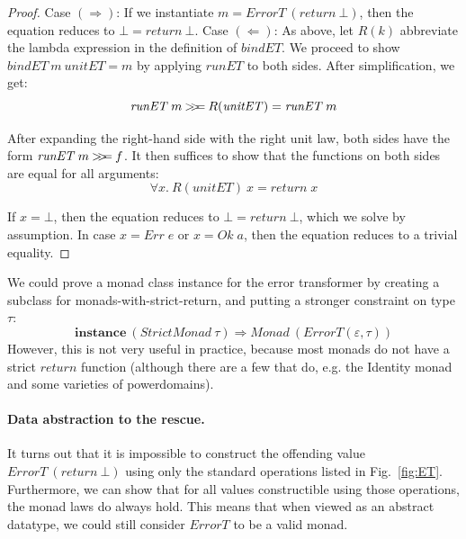 \documentclass{sigplanconf}
\newcommand{\hsbind}{\mathbin{>\mkern-6mu>\mkern-6.5mu=}}
\newcommand{\To}{\mathbin{\Rightarrow}}
\newcommand{\kwd}[1]{\mathbf{#1}}
\newcommand{\hsc}[1]{\ensuremath{\mathit{#1}}}
\newcommand{\tE}{\varepsilon}
\newcommand{\tT}{\tau}
\theoremstyle{definition}
\begin{document}
\begin{proof}
Case $(\Longrightarrow)$: If we instantiate $m = \hsc{ErrorT}\:(\hsc{return}\:\bot)$, then the equation reduces to $\bot = \hsc{return}\:\bot$. Case $(\Longleftarrow)$: As above, let $R(k)$ abbreviate the lambda expression in the definition of \hsc{bindET}. We proceed to show $\hsc{bindET}\:m\:\hsc{unitET} = m$ by applying \hsc{runET} to both sides. After simplification, we get:
\begin{equation*}
\hsc{runET}\:m \hsbind R(\hsc{unitET}) = \hsc{runET}\:m
\end{equation*}

After expanding the right-hand side with the right unit law, both sides have the form $\hsc{runET}\:m \hsbind f$. It then suffices to show that the functions on both sides are equal for all arguments:
%
\begin{equation*}
\forall{x}.\:R(\hsc{unitET})\:x = \hsc{return}\;x
\end{equation*}

If $x = \bot$, then the equation reduces to $\bot = \hsc{return}\:\bot$, which we solve by assumption. In case $x = \hsc{Err}\;e$ or $x = \hsc{Ok}\;a$, then the equation reduces to a trivial equality.
\end{proof}

We could prove a monad class instance for the error transformer by creating a subclass for monads-with-strict-return, and putting a stronger constraint on type $\tT$:
%
\begin{equation*}
\kwd{instance}\:(\hsc{StrictMonad}\:\tT) \To \hsc{Monad}\:(\hsc{ErrorT}(\tE,\tT))
\end{equation*}
%
However, this is not very useful in practice, because most monads do not have a strict \hsc{return} function (although there are a few that do, e.g. the Identity monad and some varieties of powerdomains).

\paragraph{Data abstraction to the rescue.}

It turns out that it is impossible to construct the offending value $\hsc{ErrorT}\:(\hsc{return}\:\bot)$ using only the standard operations listed in Fig.~\ref{fig:ET}. Furthermore, we can show that for all values constructible using those operations, the monad laws do always hold. This means that when viewed as an abstract datatype, we could still consider \hsc{ErrorT} to be a valid monad.
\end{document}
